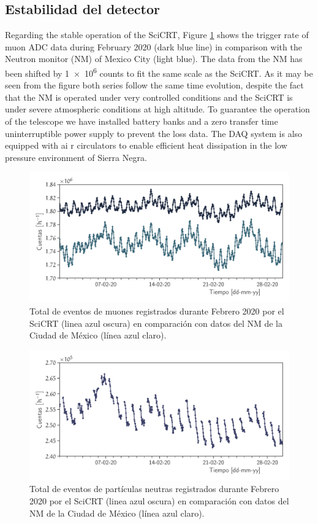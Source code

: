 \subsection{Estabilidad del detector}

Regarding the stable operation of the SciCRT, Figure \ref{fig:muon-monthly} shows the trigger rate of muon ADC data during February \num{2020} (dark blue line) in comparison with the Neutron monitor (NM) of Mexico City (light blue). The data from the NM has been shifted by \num{1e6} counts to fit the same scale as the SciCRT. As it may be seen from the figure both series follow the same time evolution, despite the fact that the NM is operated under very controlled conditions and the SciCRT is under severe atmospheric conditions at high altitude. To guarantee the operation of the telescope we have installed battery banks and a zero transfer time uninterruptible power supply to prevent the loss data. The DAQ system is also equipped with ai r circulators to enable efficient heat dissipation in the low pressure environment of Sierra Negra.

\begin{figure}
        \centering
        \includegraphics[width=\textwidth]{muon-monthly.pdf}
        \caption{Total de eventos de muones registrados durante Febrero \num{2020} por el SciCRT (linea azul oscura) en comparación con datos del NM de la Ciudad de México (línea azul claro).}
        \label{fig:muon-monthly}
\end{figure}

\begin{figure}
        \centering
        \includegraphics[width=\textwidth]{neutron-monthly.pdf}
        \caption{Total de eventos de partículas neutras registrados durante Febrero \num{2020} por el SciCRT (linea azul oscura) en comparación con datos del NM de la Ciudad de México (línea azul claro).}
        \label{fig:neutron-monthly}
\end{figure}

